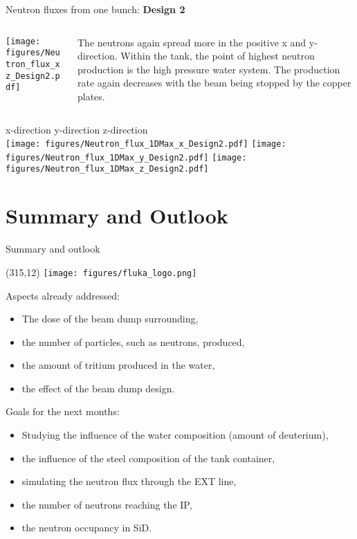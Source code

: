 \documentclass[xcolor={dvipsnames}]{beamer}
\newcommand{\flukalogo}{
  \setlength{\TPHorizModule}{1pt}
  \setlength{\TPVertModule}{1pt}
  \begin{textblock}{1}(315,12)
   \texttt{[image: figures/fluka\_logo.png]}
  \end{textblock}
}
\begin{document}
\begin{frame}{Neutron fluxes from one bunch: \textbf{Design 2}}
\begin{columns}
 \begin{column}{0.5\textwidth}
    \texttt{[image: figures/Neutron\_flux\_xz\_Design2.pdf]}
 \end{column}
 \begin{column}{0.5\textwidth}
  The neutrons again spread more in the positive x and y-direction. Within the tank, the point of highest neutron production is the high pressure water system. The production rate again decreases with the beam being stopped by the copper plates.
 \end{column}
\end{columns}
  \centering
\hspace*{1cm} x-direction \hfill y-direction \hfill z-direction \hspace*{1cm} \\
  \texttt{[image: figures/Neutron\_flux\_1DMax\_x\_Design2.pdf]}\hfill
  \texttt{[image: figures/Neutron\_flux\_1DMax\_y\_Design2.pdf]}\hfill
  \texttt{[image: figures/Neutron\_flux\_1DMax\_z\_Design2.pdf]}
\end{frame}


\section{Summary and Outlook}
\begin{frame}{Summary and outlook}
 \flukalogo
 Aspects already addressed:
\begin{itemize}
 \item The dose of the beam dump surrounding,
 \item the number of particles, such as neutrons, produced,
 \item the amount of tritium produced in the water,
 \item the effect of the beam dump design.
\end{itemize}
\vspace*{0.2cm}
 Goals for the next months:
\begin{itemize}
 \item Studying the influence of the water composition (amount of deuterium),
  \item the influence of the steel composition of the tank container,
 \item simulating the neutron flux through the EXT line,
 \item the number of neutrons reaching the IP,
 \item the neutron occupancy in SiD.
\end{itemize}
\end{frame}
\end{document}
